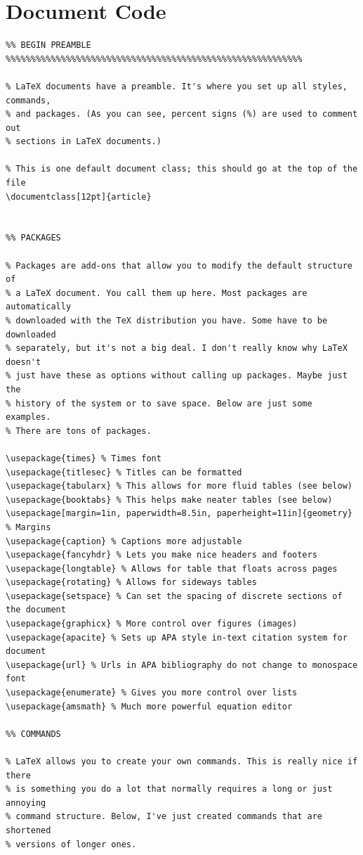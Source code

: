 \documentclass[12pt]{article}
\begin{document}
\section{Document Code}
\footnotesize
\begin{verbatim}
%% BEGIN PREAMBLE %%%%%%%%%%%%%%%%%%%%%%%%%%%%%%%%%%%%%%%%%%%%%%%%%%%%%%%%%%%

% LaTeX documents have a preamble. It's where you set up all styles, commands,
% and packages. (As you can see, percent signs (%) are used to comment out
% sections in LaTeX documents.)

% This is one default document class; this should go at the top of the file
\documentclass[12pt]{article}


%% PACKAGES

% Packages are add-ons that allow you to modify the default structure of
% a LaTeX document. You call them up here. Most packages are automatically
% downloaded with the TeX distribution you have. Some have to be downloaded
% separately, but it's not a big deal. I don't really know why LaTeX doesn't
% just have these as options without calling up packages. Maybe just the
% history of the system or to save space. Below are just some examples.
% There are tons of packages.

\usepackage{times} % Times font
\usepackage{titlesec} % Titles can be formatted
\usepackage{tabularx} % This allows for more fluid tables (see below)
\usepackage{booktabs} % This helps make neater tables (see below)
\usepackage[margin=1in, paperwidth=8.5in, paperheight=11in]{geometry} % Margins
\usepackage{caption} % Captions more adjustable
\usepackage{fancyhdr} % Lets you make nice headers and footers
\usepackage{longtable} % Allows for table that floats across pages
\usepackage{rotating} % Allows for sideways tables
\usepackage{setspace} % Can set the spacing of discrete sections of the document
\usepackage{graphicx} % More control over figures (images)
\usepackage{apacite} % Sets up APA style in-text citation system for document
\usepackage{url} % Urls in APA bibliography do not change to monospace font
\usepackage{enumerate} % Gives you more control over lists
\usepackage{amsmath} % Much more powerful equation editor

%% COMMANDS

% LaTeX allows you to create your own commands. This is really nice if there
% is something you do a lot that normally requires a long or just annoying
% command structure. Below, I've just created commands that are shortened
% versions of longer ones.


\end{verbatim}
\end{document}
